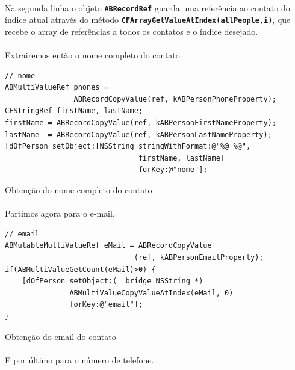 \documentclass[a4paper,12pt,brazil,doubleside]{book}
\begin{document}
\begin{singlespace}
\paragraph{}Na segunda linha o objeto \texttt{\textbf{ABRecordRef}} guarda uma referência ao contato do índice atual através do método \texttt{\textbf{CFArrayGetValueAtIndex(allPeople,i)}}, que recebe o array de referências a todos os contatos e o índice desejado.
\paragraph{}Extrairemos então o nome completo do contato.

\begin{listing}[H]
\begin{verbatim}
// nome
ABMultiValueRef phones =
                ABRecordCopyValue(ref, kABPersonPhoneProperty);
CFStringRef firstName, lastName;
firstName = ABRecordCopyValue(ref, kABPersonFirstNameProperty);
lastName  = ABRecordCopyValue(ref, kABPersonLastNameProperty);
[dOfPerson setObject:[NSString stringWithFormat:@"%@ %@",
                               firstName, lastName]
                               forKey:@"nome"];
\end{verbatim}
\caption{Obtenção do nome completo do contato}
\end{listing}

\paragraph{}Partimos agora para o e-mail.

\begin{listing}[H]
\begin{verbatim}
// email
ABMutableMultiValueRef eMail = ABRecordCopyValue
                              (ref, kABPersonEmailProperty);
if(ABMultiValueGetCount(eMail)>0) {
    [dOfPerson setObject:(__bridge NSString *)
               ABMultiValueCopyValueAtIndex(eMail, 0)
               forKey:@"email"];
}
\end{verbatim}
\caption{Obtenção do email do contato}
\end{listing}

\paragraph{}E por último para o número de telefone.
    

\end{singlespace}
\end{document}
